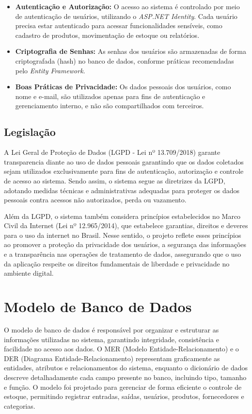 \documentclass[
	12pt,				%
	openany,			%
	twoside,			%
	a4paper,			%
	english,			%
	brazil				%
	]{abntex2}
\begin{document}
\begin{itemize}
    \item \textbf{Autenticação e Autorização:} O acesso ao sistema é controlado por meio de autenticação de usuários, utilizando o \textit{ASP.NET Identity}. Cada usuário precisa estar autenticado para acessar funcionalidades sensíveis, como cadastro de produtos, movimentação de estoque ou relatórios.

    \item \textbf{Criptografia de Senhas:} As senhas dos usuários são armazenadas de forma criptografada (hash) no banco de dados, conforme práticas recomendadas pelo \textit{Entity Framework}.

    \item \textbf{Boas Práticas de Privacidade:} Os dados pessoais dos usuários, como nome e e-mail, são utilizados apenas para fins de autenticação e gerenciamento interno, e não são compartilhados com terceiros.
\end{itemize}

\subsection{Legislação}

A  Lei Geral de Proteção de Dados (LGPD - Lei nº 13.709/2018) garante transparencia diante ao uso de dados pessoais garantindo que os dados coletados sejam utilizados exclusivamente para fins de autenticação, autorização e controle de acesso ao sistema. Sendo assim, o sistema segue as diretrizes da LGPD, adotando medidas técnicas e administrativas adequadas para proteger os dados pessoais contra acessos não autorizados, perda ou vazamento. 

Além da LGPD, o sistema também considera princípios estabelecidos no Marco Civil da Internet (Lei nº 12.965/2014), que estabelece garantias, direitos e deveres para o uso da internet no Brasil. Nesse sentido, o projeto reflete esses princípios ao promover a proteção da privacidade dos usuários, a segurança das informações e a transparência nas operações de tratamento de dados, assegurando que o uso da aplicação respeite os direitos fundamentais de liberdade e privacidade no ambiente digital.




\section{Modelo de Banco de Dados}

O modelo de banco de dados é responsável por organizar e estruturar as informações utilizadas no sistema, garantindo integridade, consistência e facilidade no acesso aos dados. O MER (Modelo Entidade-Relacionamento) e o DER (Diagrama Entidade-Relacionamento) representam graficamente as entidades, atributos e relacionamentos do sistema, enquanto o dicionário de dados descreve detalhadamente cada campo presente no banco, incluindo tipo, tamanho e função. O modelo foi projetado para gerenciar de forma eficiente o controle de estoque, permitindo registrar entradas, saídas, usuários, produtos, fornecedores e categorias.
\end{document}
